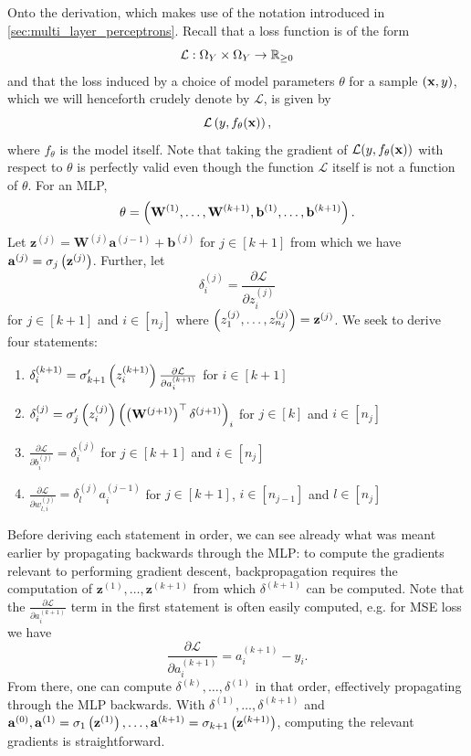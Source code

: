 \documentclass[11pt]{article}
\begin{document}
Onto the derivation, which makes use of the notation introduced in \autoref{sec:multi_layer_perceptrons}. Recall that a loss function is of the form
$$
\mathcal{L}:\Omega_{Y}\times\Omega_{Y}\to\mathbb{R}_{\geq0}
$$
and that the loss induced by a choice of model parameters $\theta$ for a sample $(\mathbf{x},y)$, which we will henceforth crudely denote by $\mathcal{L}$, is given by
$$
\mathcal{L}\left(y,f_{\theta}(\mathbf{x})\right),
$$
where $f_{\theta}$ is the model itself. Note that taking the gradient of $\mathcal{L}(y,f_{\theta}(\mathbf{x}))$ with respect to $\theta$ is perfectly valid even though the function $\mathcal{L}$ itself is not a function of $\theta$. For an MLP,
$$
\theta
=
\left(\mathbf{W}^{(1)},\dots,\mathbf{W}^{(k+1)},\mathbf{b}^{(1)},\dots,\mathbf{b}^{(k+1)}\right).
$$
Let $\mathbf{z}^{(j)}=\mathbf{W}^{(j)}\mathbf{a}^{(j-1)}+\mathbf{b}^{(j)}$ for $j\in[k+1]$ from which we have $\mathbf{a}^{(j)}=\sigma_{j}\left(\mathbf{z}^{(j)}\right)$. Further, let
$$
\delta^{(j)}_i
=
\frac{\partial\mathcal{L}}{\partial z^{(j)}_i}
$$
for $j\in[k+1]$ and $i\in[n_j]$ where $\left(z_1^{(j)},\dots,z_{n_j}^{(j)}\right)=\mathbf{z}^{(j)}$. We seek to derive four statements:
\begin{enumerate}
    \item $\delta_i^{(k+1)}=\sigma_{k+1}'\left(z_i^{(k+1)}\right)\frac{\partial\mathcal{L}}{\partial a_i^{(k+1)}}$ for $i\in[k+1]$
    \item $\delta_i^{(j)}=\sigma_{j}'\left(z_i^{(j)}\right)\left(\left(\mathbf{W}^{(j+1)}\right)^\top\delta^{(j+1)}\right)_i$ for $j\in[k]$ and $i\in[n_j]$
    \item $\frac{\partial\mathcal{L}}{\partial b^{(j)}_i}=\delta^{(j)}_i$ for $j\in[k+1]$ and $i\in[n_j]$
    \item $\frac{\partial\mathcal{L}}{\partial w_{l,i}^{(j)}}=\delta_l^{(j)}a_i^{(j-1)}$ for $j\in[k+1]$, $i\in[n_{j-1}]$ and $l\in[n_j]$
\end{enumerate}
Before deriving each statement in order, we can see already what was meant earlier by propagating backwards through the MLP: to compute the gradients relevant to performing gradient descent, backpropagation requires the computation of $\mathbf{z}^{(1)},\dots,\mathbf{z}^{(k+1)}$ from which $\delta^{(k+1)}$ can be computed. Note that the $\frac{\partial\mathcal{L}}{\partial a_i^{(k+1)}}$ term in the first statement is often easily computed, e.g. for MSE loss we have
$$
\frac{\partial\mathcal{L}}{\partial a_i^{(k+1)}}
=
a_i^{(k+1)}-y_i.
$$
From there, one can compute $\delta^{(k)},\dots,\delta^{(1)}$ in that order, effectively propagating through the MLP backwards. With $\delta^{(1)},\dots,\delta^{(k+1)}$ and $\mathbf{a}^{(0)},\mathbf{a}^{(1)}=\sigma_1\left(\mathbf{z}^{(1)}\right),\dots,\mathbf{a}^{(k+1)}=\sigma_{k+1}\left(\mathbf{z}^{(k+1)}\right)$, computing the relevant gradients is straightforward.
\end{document}

